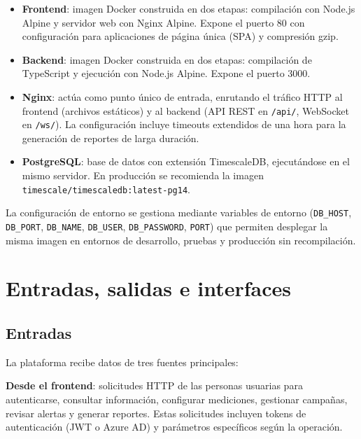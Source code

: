 \begin{itemize}
    \item \textbf{Frontend}: imagen Docker construida en dos etapas:
    compilación con Node.js Alpine y servidor web con Nginx Alpine. Expone el
    puerto 80 con configuración para aplicaciones de página única (SPA) y
    compresión gzip.

    \item \textbf{Backend}: imagen Docker construida en dos etapas:
    compilación de TypeScript y ejecución con Node.js Alpine. Expone el puerto
    3000.

    \item \textbf{Nginx}: actúa como punto único de entrada, enrutando el
    tráfico HTTP al frontend (archivos estáticos) y al backend (API REST en
    \texttt{/api/}, WebSocket en \texttt{/ws/}). La configuración incluye
    timeouts extendidos de una hora para la generación de reportes de larga
    duración.

    \item \textbf{PostgreSQL}: base de datos con extensión TimescaleDB,
    ejecutándose en el mismo servidor. En producción se recomienda la imagen
    \texttt{timescale/timescaledb:latest-pg14}.
\end{itemize}

La configuración de entorno se gestiona mediante variables de entorno
(\texttt{DB\_HOST}, \texttt{DB\_PORT}, \texttt{DB\_NAME}, \texttt{DB\_USER},
\texttt{DB\_PASSWORD}, \texttt{PORT}) que permiten desplegar la misma imagen
en entornos de desarrollo, pruebas y producción sin recompilación.

\section{Entradas, salidas e interfaces}

\subsection{Entradas}

La plataforma recibe datos de tres fuentes principales:

\textbf{Desde el frontend}: solicitudes HTTP de las personas usuarias para
autenticarse, consultar información, configurar mediciones, gestionar
campañas, revisar alertas y generar reportes. Estas solicitudes incluyen
tokens de autenticación (JWT o Azure AD) y parámetros específicos según la
operación.

